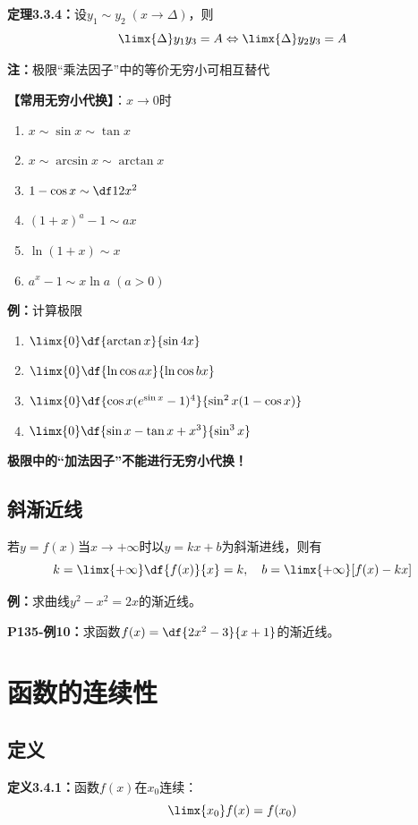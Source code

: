 {\bf 定理3.3.4：}设$y_1\sim y_2\;(x\to\Delta)$，则
$$\limx{\Delta}y_1y_3=A\Leftrightarrow\limx{\Delta}y_2y_3=A$$

{\bf 注：}极限“乘法因子”中的等价无穷小可相互替代

{\bf 【常用无穷小代换】}：$x\to 0$时
\begin{enumerate}[(1)]
  \setlength{\itemindent}{1cm}
  \item $x\sim \sin x\sim \tan x$ 
  \item $x \sim\arcsin x\sim\arctan x$ 
  \item $1-\cos x\sim \df 12 x^2$ 
  \item $(1+x)^a-1\sim ax$ 
  \item $\ln(1+x)\sim x$ 
  \item $a^x-1\sim x\ln a\;(a>0)$
\end{enumerate}

{\bf 例：}计算极限
\begin{enumerate}[(1)]
  \setlength{\itemindent}{1cm}
  \item $\limx{0}\df{\arctan x}{\sin 4x}$ 
  \item $\limx{0}\df{\ln\cos ax}{\ln\cos bx}$ 
  \item $\limx{0}\df{\cos x(e^{\sin x}-1)^4}{\sin^2 x(1-\cos x)}$ 
  \item $\limx{0}\df{\sin x-\tan x+x^3}{\sin^3 x}$
\end{enumerate}

{\bf 极限中的“加法因子”不能进行无穷小代换！}

\subsection{斜渐近线}

若$y=f(x)$当$x\to+\infty$时以$y=kx+b$为斜渐进线，则有
$$k=\limx{+\infty}\df{f(x)}{x}=k,\quad b=\limx{+\infty}[f(x)-kx]$$

{\bf 例：}求曲线$y^2-x^2=2x$的渐近线。

{\bf P135-例10：}求函数$f(x)=\df{2x^2-3}{x+1}$的渐近线。

\section{函数的连续性}

\subsection{定义}

{\bf 定义3.4.1：}函数$f(x)$在$x_0$连续：
$$\limx{x_0}f(x)=f(x_0)$$

